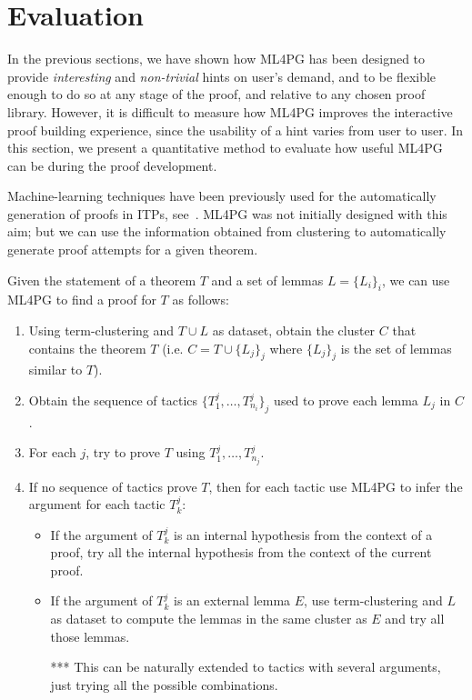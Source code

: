 \section{Evaluation}\label{sec:evaluation}

In the previous sections, we have shown how ML4PG has been designed to provide \emph{interesting} and \emph{non-trivial} hints on user's demand, 
and to be flexible enough to do so at any stage of the proof, and relative to any chosen proof library. 
However, it is difficult to measure how ML4PG improves the interactive proof building experience, since
the usability of a hint varies from user to user. In this section, we present a quantitative method to evaluate
how useful ML4PG can be during the proof development.


Machine-learning techniques have been previously used for the automatically generation of proofs in 
ITPs, see~\cite{Duncan02,DixonF03,GNR14}. ML4PG was not initially designed with this aim;
but we can use the information obtained from clustering to automatically generate proof attempts for a given theorem. 

\begin{PEM}\label{pem}
Given the statement of a theorem $T$ and a set of lemmas $L=\{L_i\}_i$, we can use ML4PG to find a proof for $T$ as follows:
\begin{enumerate}
 \item Using term-clustering and $T\cup L$ as dataset, obtain the cluster $C$ that contains the theorem $T$ (i.e. $C=T\cup \{L_j\}_j$ where $\{L_j\}_j$ is the set of lemmas similar to $T$).
 \item Obtain the sequence of tactics $\{T_1^j,\ldots,T_{n_i}^j\}_{j}$ used to prove each lemma $L_j$ in $C$.
 \item For each $j$, try to prove $T$ using $T_1^j,\ldots,T_{n_j}^j$.
 \item If no sequence of tactics prove $T$, then for each tactic use ML4PG to infer the argument for each tactic $T_k^j$:
    \begin{itemize}
     \item If the argument of $T_k^j$ is an internal hypothesis from the context of a proof, try all the internal hypothesis from the context of the current proof. 
     \item If the argument of $T_k^j$ is an external lemma $E$, use term-clustering and $L$ as dataset to compute the lemmas in the same cluster as $E$ and try all those lemmas.
     \item[***] This can be naturally extended to tactics with several arguments, just trying all the possible combinations. 
  \end{itemize}    
\end{enumerate}
\end{PEM}

